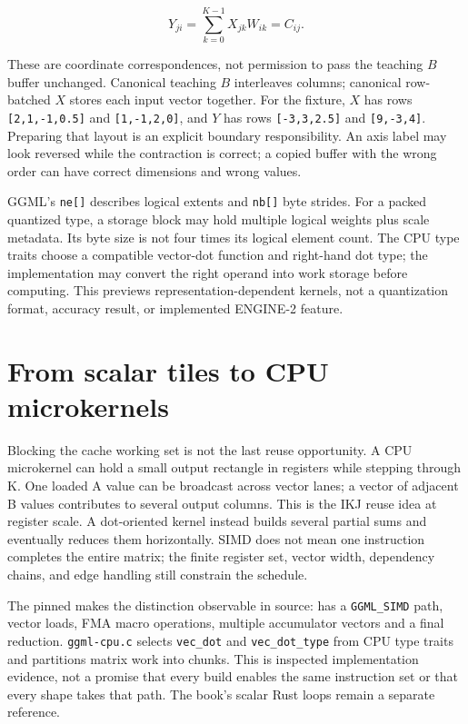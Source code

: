 \begin{equation}
Y_{ji}=\sum_{k=0}^{K-1} X_{jk}W_{ik}=C_{ij}.
\end{equation}

These are coordinate correspondences, not permission to pass the
teaching \(B\) buffer unchanged. Canonical teaching \(B\) interleaves
columns; canonical row-batched \(X\) stores each input vector together.
For the fixture, \(X\) has rows \texttt{{[}2,1,-1,0.5{]}} and
\texttt{{[}1,-1,2,0{]}}, and \(Y\) has rows \texttt{{[}-3,3,2.5{]}} and
\texttt{{[}9,-3,4{]}}. Preparing that layout is an explicit boundary
responsibility. An axis label may look reversed while the contraction is
correct; a copied buffer with the wrong order can have correct
dimensions and wrong values.

GGML's \texttt{ne{[}{]}} describes logical extents and \texttt{nb{[}{]}}
byte strides. For a packed quantized type, a storage block may hold
multiple logical weights plus scale metadata. Its byte size is not four
times its logical element count. The CPU type traits choose a compatible
vector-dot function and right-hand dot type; the implementation may
convert the right operand into work storage before computing. This
previews representation-dependent kernels, not a quantization format,
accuracy result, or implemented ENGINE-2 feature.

\section{From scalar tiles to CPU
microkernels}\label{from-scalar-tiles-to-cpu-microkernels}

Blocking the cache working set is not the last reuse opportunity. A CPU
microkernel can hold a small output rectangle in registers while
stepping through K. One loaded A value can be broadcast across vector
lanes; a vector of adjacent B values contributes to several output
columns. This is the IKJ reuse idea at register scale. A dot-oriented
kernel instead builds several partial sums and eventually reduces them
horizontally. SIMD does not mean one instruction completes the entire
matrix; the finite register set, vector width, dependency chains, and
edge handling still constrain the schedule.

The pinned \texttt{} makes the distinction
observable in source: \texttt{} has a
\texttt{GGML\_SIMD} path, vector loads, FMA macro operations, multiple
accumulator vectors and a final reduction. \texttt{ggml-cpu.c} selects
\texttt{vec\_dot} and \texttt{vec\_dot\_type} from CPU type traits and
partitions matrix work into chunks. This is inspected implementation
evidence, not a promise that every build enables the same instruction
set or that every shape takes that path. The book's scalar Rust loops
remain a separate reference.

